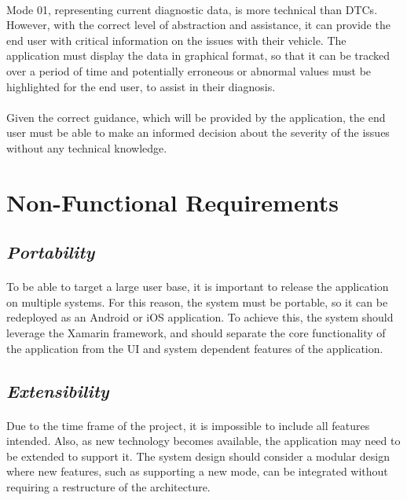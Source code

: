 	\paragraph{}{
	Mode 01, representing current diagnostic data, is more technical than DTCs. However, with the correct level of abstraction and assistance, it can provide the end user with critical information on the issues with their vehicle. The application must display the data in graphical format, so that it can be tracked over a period of time and potentially erroneous or abnormal values must be highlighted for the end user, to assist in their diagnosis.
	}
	\paragraph{}{
	Given the correct guidance, which will be provided by the application, the end user must be able to make an informed decision about the severity of the issues without any technical knowledge.
	}

\section{Non-Functional Requirements}
	\subsection*{\textit{Portability}}
		\paragraph{}{
		To be able to target a large user base, it is important to release the application on multiple systems. For this reason, the system must be portable, so it can be redeployed as an Android or iOS application. To achieve this, the system should leverage the Xamarin framework, and should separate the core functionality of the application from the UI and system dependent features of the application.
		}
	\subsection*{\textit{Extensibility}}
		\paragraph{}{
		Due to the time frame of the project, it is impossible to include all features intended. Also, as new technology becomes available, the application may need to be extended to support it. The system design should consider a modular design where new features, such as supporting a new mode, can be integrated without requiring a restructure of the architecture.
		}
